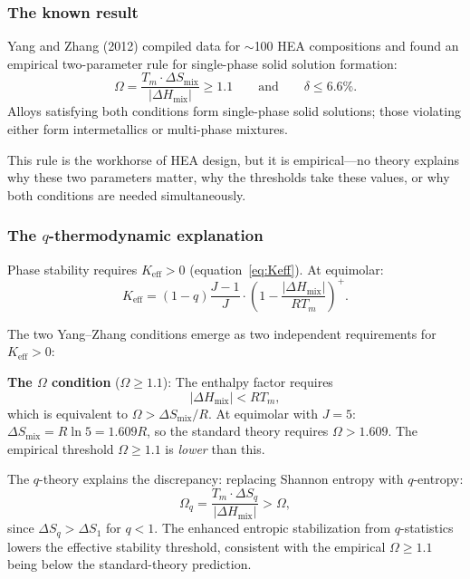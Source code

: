 \documentclass[12pt,letterpaper]{article}
\theoremstyle{definition}
\begin{document}
\subsubsection{The known result}

Yang and Zhang (2012) compiled data for $\sim$100 HEA compositions and found an empirical two-parameter rule for single-phase solid solution formation:
\begin{equation}
  \Omega = \frac{T_m \cdot \Delta S_{\mathrm{mix}}}{|\Delta H_{\mathrm{mix}}|} \geq 1.1 \qquad \text{and} \qquad \delta \leq 6.6\%.
\end{equation}
Alloys satisfying both conditions form single-phase solid solutions; those violating either form intermetallics or multi-phase mixtures.

This rule is the workhorse of HEA design, but it is empirical---no theory explains why these two parameters matter, why the thresholds take these values, or why both conditions are needed simultaneously.

\subsubsection{The $q$-thermodynamic explanation}

Phase stability requires $K_{\mathrm{eff}} > 0$ (equation~\ref{eq:Keff}).  At equimolar:
\begin{equation}
  K_{\mathrm{eff}} = (1-q)\frac{J-1}{J} \cdot \left(1 - \frac{|\Delta H_{\mathrm{mix}}|}{RT_m}\right)^+.
\end{equation}

The two Yang--Zhang conditions emerge as two independent requirements for $K_{\mathrm{eff}} > 0$:

\textbf{The $\Omega$ condition} ($\Omega \geq 1.1$): The enthalpy factor requires
\begin{equation}
  |\Delta H_{\mathrm{mix}}| < RT_m,
\end{equation}
which is equivalent to $\Omega > \Delta S_{\mathrm{mix}} / R$.  At equimolar with $J = 5$: $\Delta S_{\mathrm{mix}} = R\ln 5 = 1.609R$, so the standard theory requires $\Omega > 1.609$.  The empirical threshold $\Omega \geq 1.1$ is \emph{lower} than this.

The $q$-theory explains the discrepancy: replacing Shannon entropy with $q$-entropy:
\begin{equation}
  \Omega_q = \frac{T_m \cdot \Delta S_q}{|\Delta H_{\mathrm{mix}}|} > \Omega,
\end{equation}
since $\Delta S_q > \Delta S_1$ for $q < 1$.  The enhanced entropic stabilization from $q$-statistics lowers the effective stability threshold, consistent with the empirical $\Omega \geq 1.1$ being below the standard-theory prediction.
\end{document}
